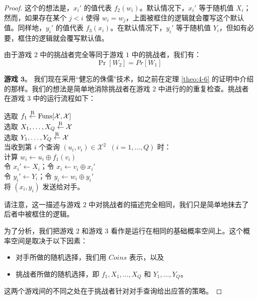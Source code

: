 \begin{proof}
\vspace{5pt}

\noindent
这个的想法是，$x_i'$ 的值代表 $f_2(w_i)$。默认情况下，$x_i'$ 等于随机值 $X_i$；然而，如果存在某个 $j<i$ 使得 $w_i=w_j$，上面被框住的逻辑就会覆写这个默认值。同样地，$y_i'$ 的值代表 $f_3(x_i)$。在默认情况下，$y_i'$ 等于随机值 $Y_i$，但如有必要，框住的逻辑就会覆写默认值。

由于游戏 $2$ 中的挑战者完全等同于游戏 $1$ 中的挑战者，我们有：
\begin{equation}\label{eq:4-26}
\Pr[W_2]=Pr[W_1]
\end{equation}

\noindent
\textbf{游戏 $\mathbf{3}$}。
我们现在采用``健忘的侏儒"技术，如之前在定理 \ref{theo:4-6} 的证明中介绍的那样。我们的想法是简单地消除挑战者在游戏 $2$ 中进行的的重复检查。挑战者在游戏 $3$ 中的运行流程如下：

\vspace{5pt}

\hspace*{5pt} 选取 $f_1\overset{\rm R}\leftarrow{\rm Funs}[\mathcal{X},\mathcal{X}]$\\
\hspace*{26pt} 选取 $X_1,\dots,X_Q\overset{\rm R}\leftarrow\mathcal{X}$\\
\hspace*{26pt} 选取 $Y_1,\dots,Y_Q\overset{\rm R}\leftarrow\mathcal{X}$\\
\hspace*{26pt} 当收到第 $i$ 个查询 $(u_i,v_i)\in\mathcal{X}^2\;\;(i=1,\dots,Q)$ 时：\\
\hspace*{50pt} 计算 $w_i\leftarrow u_i\oplus f_1(v_i)$\\
\hspace*{50pt} 令 $x_i'\leftarrow X_i$；令 $x_i\leftarrow v_i\oplus x_i'$\\
\hspace*{50pt} 令 $y_i'\leftarrow Y_i$；令 $y_i\leftarrow w_i\oplus y_i'$\\
\hspace*{50pt} 将 $(x_i,y_i)$ 发送给对手。

\vspace{5pt}

请注意，这一描述与游戏 $2$ 中对挑战者的描述完全相同，我们只是简单地抹去了后者中被框住的逻辑。

为了分析，我们把游戏 $2$ 和游戏 $3$ 看作是运行在相同的基础概率空间上。这个概率空间是取决于以下因素：
\begin{itemize}
	\item 对手所做的随机选择，我们用 $Coins$ 表示，以及
	\item 挑战者所做的随机选择，即 $f_1,X_1,\dots,X_Q$ 和 $Y_1,\dots,Y_Q$。
\end{itemize}
这两个游戏间的不同之处在于挑战者针对对手查询给出应答的策略。


\end{proof}
